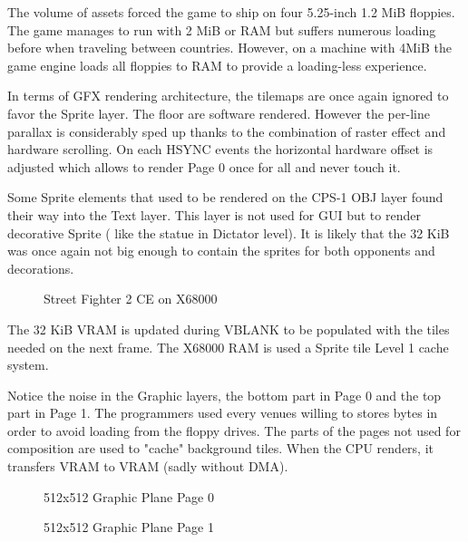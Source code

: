 The volume of assets forced the game to ship on four 5.25-inch 1.2 MiB floppies. The game manages to run with 2 MiB or RAM but suffers numerous loading before when traveling between countries. However, on a machine with 4MiB the game engine loads all floppies to RAM to provide a loading-less experience.

In terms of GFX rendering architecture, the tilemaps are once again ignored to favor the Sprite layer. The floor are software rendered. However the per-line parallax is considerably sped up thanks to the combination of raster effect and hardware scrolling. On each HSYNC events the horizontal hardware offset is adjusted which allows to render Page 0 once for all and never touch it.

Some Sprite elements that used to be rendered on the CPS-1 OBJ layer found their way into the Text layer. This layer is not used for GUI but to render decorative Sprite (  like the statue in Dictator level). It is likely that the 32 KiB was once again not big enough to contain the sprites for both opponents and decorations.

\begin{figure}[H]
\caption*{Street Fighter 2 CE on X68000}
\end{figure}


\pagebreak

The 32 KiB VRAM is updated during VBLANK to be populated with the tiles needed on the next frame. The X68000 RAM is used a Sprite tile Level 1 cache system.

Notice the noise in the Graphic layers, the bottom part in Page 0 and the top part in Page 1. The programmers used every venues willing to stores bytes in order to avoid loading from the floppy drives. The parts of the pages not used for composition are used to "cache" background tiles. When the CPU renders, it transfers VRAM to VRAM (sadly without DMA).

\vspace{-4ex}
\begin{minipage}[t]{0.49\linewidth}
  \begin{figure}[H]
  \caption*{512x512 Graphic Plane Page 0}
  \end{figure}
\end{minipage}%
\hfill
\begin{minipage}[t]{0.49\linewidth}
  \begin{figure}[H]
  \caption*{512x512 Graphic Plane Page 1}
  \end{figure}
\end{minipage}%

